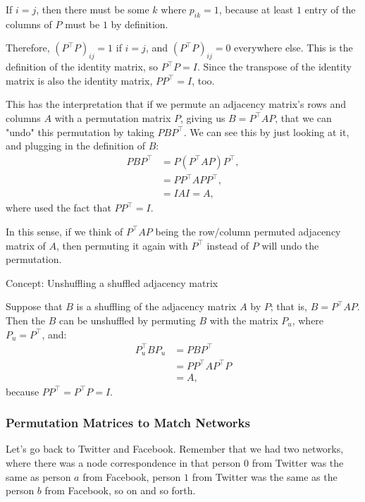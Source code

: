 If $i = j$, then there must be some $k$ where $p_{ik} = 1$, because at least $1$ entry of the columns of $P$ must be $1$ by definition.

Therefore, $(P^\top P)_{ij} = 1$ if $i = j$, and $(P^\top P)_{ij} = 0$ everywhere else. This is the definition of the identity matrix, so $P^\top P = I$. Since the transpose of the identity matrix is also the identity matrix, $PP^\top = I$, too.

This has the interpretation that if we permute an adjacency matrix's rows and columns $A$ with a permutation matrix $P$, giving us $B = P^\top A P$, that we can "undo" this permutation by taking $PBP^\top$. We can see this by just looking at it, and plugging in the definition of $B$:
\begin{align*}
    PBP^\top &= P\left(P^\top A P\right)P^\top, \\
    &= PP^\top A PP^\top, \\
    &= I A I = A,
\end{align*}
where  used the fact that $PP^\top = I$.

In this sense, if we think of $P^\top A P$ being the row/column permuted adjacency matrix of $A$, then permuting it again with $P^\top$ instead of $P$ will undo the permutation.

\begin{floatingbox}[h]\caption{Concept: Unshuffling a shuffled adjacency matrix}
\label{box:ch8:gm:unshuffle}
Suppose that $B$ is a shuffling of the adjacency matrix $A$ by $P$; that is, $B = P^\top AP$. Then the $B$ can be unshuffled by permuting $B$ with the matrix $P_u$, where $P_u = P^\top$, and:
\begin{align*}
    P_u^\top B P_u &= P B P^\top \\
     &= PP^\top A P^\top P \\
     &= A,
\end{align*}
because $PP^\top = P^\top P = I$.
\end{floatingbox}

\subsubsection{Permutation Matrices to Match Networks}

Let's go back to Twitter and Facebook. Remember that we had two networks, where there was a node correspondence in that person $0$ from Twitter was the same as person $a$ from Facebook, person $1$ from Twitter was the same as the person $b$ from Facebook, so on and so forth. 

